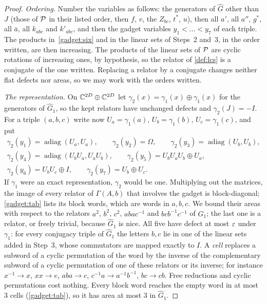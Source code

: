 \begin{proof}
\emph{Ordering.} Number the variables as follows: the generators of $\widehat G$ other than $J$ (those of $\mathcal P$ in their listed order,
then $f$, $v$, the $Z_{bc}$, $t^*$, $u$), then all $a'$, all $a''$, $g^*$, all $\bar a$, all $k_{abc}$ and $k'_{abc}$, and then the gadget
variables $y_1<\dots<y_7$ of each triple. The products in~\eqref{gadget:six} and in the linear sets of Steps~2 and~3, in the order written,
are then increasing. The products of the linear sets of $\mathcal P$ are cyclic rotations of increasing ones, by hypothesis, so the relator of
\cref{def:lcs} is a conjugate of the one written. Replacing a relator by a conjugate changes neither flat defects nor areas, so we may work
with the orders written.

\emph{The representation.} On $\mathbb C^{2D}\oplus\mathbb C^{2D}$ let $\gamma_2(x)=\gamma_1(x)\oplus\gamma_1(x)$ for the generators of $\widehat G_1$, so the
kept relators have unchanged defects and $\gamma_2(J)=-I$. For a triple $(a,b,c)$ write now $U_a=\gamma_1(a)$, $U_b=\gamma_1(b)$,
$U_c=\gamma_1(c)$, and put
\begin{gather*}
\gamma_2(y_1)=\operatorname{adiag}(U_a,U_a),\qquad\gamma_2(y_2)=\Omega,\qquad\gamma_2(y_3)=\operatorname{adiag}(U_b,U_b),\\
\gamma_2(y_4)=\operatorname{adiag}(U_bU_a,U_aU_b),\qquad\gamma_2(y_5)=U_bU_aU_b\oplus U_a,\\
\gamma_2(y_6)=U_bU_c\oplus I,\qquad\gamma_2(y_7)=U_b\oplus U_c .
\end{gather*}
If $\gamma_1$ were an exact representation, $\gamma_2$ would be one. Multiplying out the matrices, the image of every relator of
$\Gamma(A,b)$ that involves the gadget is block-diagonal; \cref{gadget:tab} lists its block words, which are words in $a,b,c$. We bound their
areas with respect to the relators $a^2$, $b^2$, $c^2$, $abac^{-1}$ and $bcb^{-1}c^{-1}$ of $\widehat G_1$; the last one is a relator, or
freely trivial, because $\widehat G_1$ is nice. All five have defect at most $\varepsilon$ under $\gamma_1$: for every conjugacy triple of
$\widehat G_1$ the letters $b,c$ lie in one of the linear sets added in Step~3, whose commutators are mapped exactly to $I$. A \emph{cell} replaces a subword of a cyclic permutation of the word by the inverse of the
complementary subword of a cyclic permutation of one of these relators or its inverse; for instance $x^{-1}\to x$, $xx\to e$, $aba\to c$,
$c^{-1}a\to a^{-1}b^{-1}$, $bc\to cb$. Free reductions and cyclic permutations cost nothing. Every block word reaches the empty word in at
most $3$ cells (\cref{gadget:tab}), so it has area at most $3$ in $\widehat G_1$.


\end{proof}
